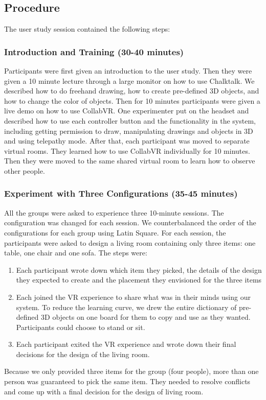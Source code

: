 \documentclass[chi_draft]{sigchi}
\begin{document}
\subsection{Procedure}
The user study session contained the following steps:
\subsubsection{Introduction and Training (30-40 minutes)}
Participants were first given an introduction to the user study. Then they were given a 10 minute lecture through a large monitor on how to use Chalktalk. We described how to do freehand drawing, how to create pre-defined 3D objects, and how to change the color of objects.
Then for 10 minutes participants were given a live demo on how to use CollabVR. One experimenter put on the headset and described how to use each controller button and the functionality in the system, including getting permission to draw, manipulating drawings and objects in 3D and using telepathy mode.
After that, each participant was moved to separate virtual rooms. They learned how to use CollabVR individually for 10 minutes. Then they were moved to the same shared virtual room to learn how to observe other people.

\subsubsection{Experiment with Three Configurations (35-45 minutes)}
All the groups were asked to experience three 10-minute sessions. The configuration was changed for each session. We counterbalanced the order of the configurations for each group using Latin Square. For each session, the participants were asked to design a living room containing only three items: one table, one chair and one sofa. The steps were:
\begin{enumerate}
    \item Each participant wrote down which item they picked, the details of the design they expected to create and the placement they envisioned for  the three items
	\item Each joined the VR experience to share what was in their minds using our system. To reduce the learning curve, we drew the entire dictionary of pre-defined 3D objects on one board for them to copy and use as they wanted. Participants could choose to stand or sit.
	\item Each participant exited the VR experience and wrote down their final decisions for the design of the living room.
\end{enumerate}
Because we only provided three items for the group (four people), more than one person was guaranteed to pick the same item. They needed to resolve conflicts and come up with a final decision for the design of living room.
\end{document}
